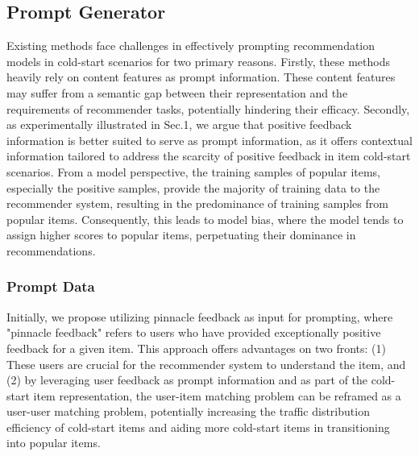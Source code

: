 \documentclass[sigconf]{acmart}
\begin{document}
\subsection{Prompt Generator}
Existing methods face challenges in effectively prompting recommendation models in cold-start scenarios for two primary reasons. 
Firstly, these methods heavily rely on content features as prompt information. 
These content features may suffer from a semantic gap between their representation and the requirements of recommender tasks, potentially hindering their efficacy. 
Secondly, as experimentally illustrated in Sec.1, we argue that positive feedback information is better suited to serve as prompt information, as it offers contextual information tailored to address the scarcity of positive feedback in item cold-start scenarios. 
From a model perspective, the training samples of popular items, especially the positive samples, provide the majority of training data to the recommender system, resulting in the predominance of training samples from popular items. 
Consequently, this leads to model bias, where the model tends to assign higher scores to popular items, perpetuating their dominance in recommendations.
\subsubsection{Prompt Data}
Initially, we propose utilizing pinnacle feedback as input for prompting, where "pinnacle feedback" refers to users who have provided exceptionally positive feedback for a given item. 
This approach offers advantages on two fronts: (1) These users are crucial for the recommender system to understand the item, and (2) by leveraging user feedback as prompt information and as part of the cold-start item representation, the user-item matching problem can be reframed as a user-user matching problem, potentially increasing the traffic distribution efficiency of cold-start items and aiding more cold-start items in transitioning into popular items. 
\end{document}
